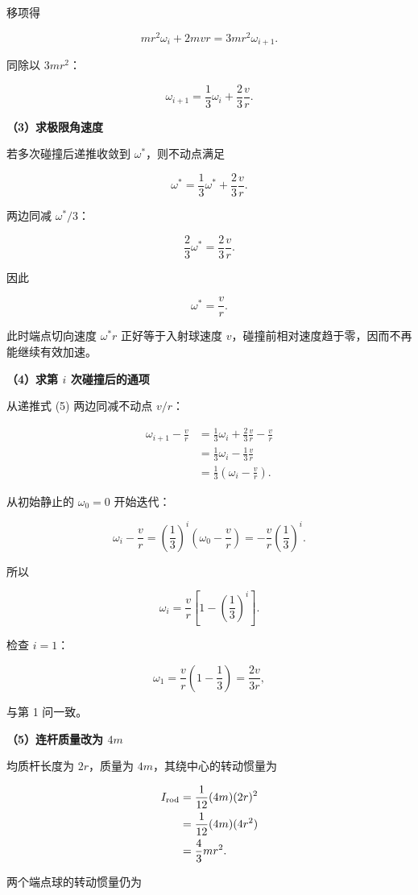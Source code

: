 \documentclass[12pt,a4paper,UTF8]{ctexart}
\begin{document}
移项得

\[
mr^2\omega_i+2mvr=3mr^2\omega_{i+1}.
\]

同除以 \(3mr^2\)：

\[
\boxed{\omega_{i+1}=\frac13\omega_i+\frac23\frac vr}. \tag{5}
\]

\textbf{（3）求极限角速度}

若多次碰撞后递推收敛到 \(\omega^*\)，则不动点满足

\[
\omega^*=\frac13\omega^*+\frac23\frac vr.
\]

两边同减 \(\omega^*/3\)：

\[
\frac23\omega^*=\frac23\frac vr.
\]

因此

\[
\boxed{\omega^*=\frac vr}.
\]

此时端点切向速度 \(\omega^*r\) 正好等于入射球速度
\(v\)，碰撞前相对速度趋于零，因而不再能继续有效加速。

\textbf{（4）求第 \(i\) 次碰撞后的通项}

从递推式 (5) 两边同减不动点 \(v/r\)：

\[
\begin{aligned}
\omega_{i+1}-\frac vr
&=\frac13\omega_i+\frac23\frac vr-\frac vr\\
&=\frac13\omega_i-\frac13\frac vr\\
&=\frac13\left(\omega_i-\frac vr\right).
\end{aligned}
\]

从初始静止的 \(\omega_0=0\) 开始迭代：

\[
\omega_i-\frac vr
=\left(\frac13\right)^i
\left(\omega_0-\frac vr\right)
=-\frac vr\left(\frac13\right)^i.
\]

所以

\[
\boxed{\omega_i=\frac vr\left[1-\left(\frac13\right)^i\right]}.
\]

检查 \(i=1\)：

\[
\omega_1=\frac vr\left(1-\frac13\right)=\frac{2v}{3r},
\]

与第 1 问一致。

\textbf{（5）连杆质量改为 \(4m\)}

均质杆长度为 \(2r\)，质量为 \(4m\)，其绕中心的转动惯量为

\[
\begin{aligned}
I_{\rm rod}
&=\frac1{12}(4m)(2r)^2\\
&=\frac1{12}(4m)(4r^2)\\
&=\frac43mr^2.
\end{aligned}
\]

两个端点球的转动惯量仍为
\end{document}
